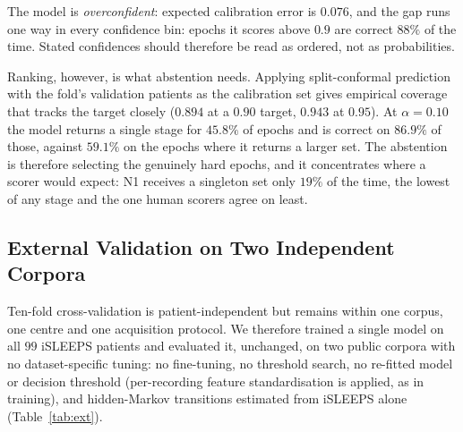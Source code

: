 \documentclass{ieeeaccess}
\begin{document}
The model is \emph{overconfident}: expected calibration error is $0.076$, and the gap runs one
way in every confidence bin: epochs it scores above $0.9$ are correct $88\%$ of the time.
Stated confidences should therefore be read as ordered, not as probabilities.

Ranking, however, is what abstention needs. Applying split-conformal prediction with the
fold's validation patients as the calibration set gives empirical coverage that tracks the
target closely ($0.894$ at a $0.90$ target, $0.943$ at $0.95$). At $\alpha=0.10$ the model
returns a single stage for $45.8\%$ of epochs and is correct on $86.9\%$ of those, against
$59.1\%$ on the epochs where it returns a larger set. The abstention is therefore selecting the
genuinely hard epochs, and it concentrates where a scorer would
expect: N1 receives a singleton set only $19\%$ of the time, the lowest of any stage and the
one human scorers agree on least.

\subsection{External Validation on Two Independent Corpora}
\label{sec:external}
Ten-fold cross-validation is patient-independent but remains within one corpus, one centre
and one acquisition protocol. We therefore trained a single model on all $99$ iSLEEPS
patients and evaluated it, unchanged, on two public corpora with no dataset-specific
tuning: no fine-tuning, no threshold search, no re-fitted model or decision threshold (per-recording feature standardisation is applied, as in training), and hidden-Markov
transitions estimated from iSLEEPS alone (Table~\ref{tab:ext}).
\end{document}
